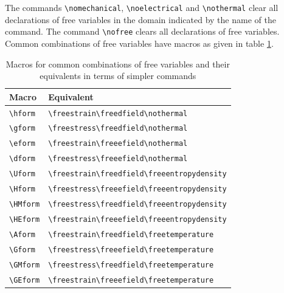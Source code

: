 \documentclass[a4paper, 12pt]{article}
\begin{document}
The commands \verb|\nomechanical|, \verb|\noelectrical| and \verb|\nothermal| clear all declarations of free variables in the domain indicated by the name of the command. The command \verb|\nofree| clears all declarations of
free variables. Common combinations of free variables have macros as given in table \ref{tab:formcommands}.
\begin{table}
  \caption{Macros for common combinations of free variables and their equivalents in terms of simpler commands}
  \label{tab:formcommands}
  \centering
  \begin{tabular}{ll}
    \hline\hline
    \rule{0pt}{2.5ex}Macro  & Equivalent  \\
    \hline
    \verb|\hform| & \verb|\freestrain\freedfield\nothermal| \\          
    \verb|\gform| & \verb|\freestress\freedfield\nothermal| \\          
    \verb|\eform| & \verb|\freestrain\freeefield\nothermal| \\          
    \verb|\dform| & \verb|\freestress\freeefield\nothermal| \\          
    \verb|\Uform| & \verb|\freestrain\freedfield\freeentropydensity| \\ 
    \verb|\Hform| & \verb|\freestress\freeefield\freeentropydensity| \\ 
    \verb|\HMform| & \verb|\freestress\freedfield\freeentropydensity| \\
    \verb|\HEform| & \verb|\freestrain\freeefield\freeentropydensity| \\
    \verb|\Aform| & \verb|\freestrain\freedfield\freetemperature| \\    
    \verb|\Gform| & \verb|\freestress\freeefield\freetemperature| \\    
    \verb|\GMform| & \verb|\freestress\freedfield\freetemperature| \\   
    \verb|\GEform| & \verb|\freestrain\freeefield\freetemperature| \\   
    \hline
  \end{tabular}
\end{table}
\end{document}
